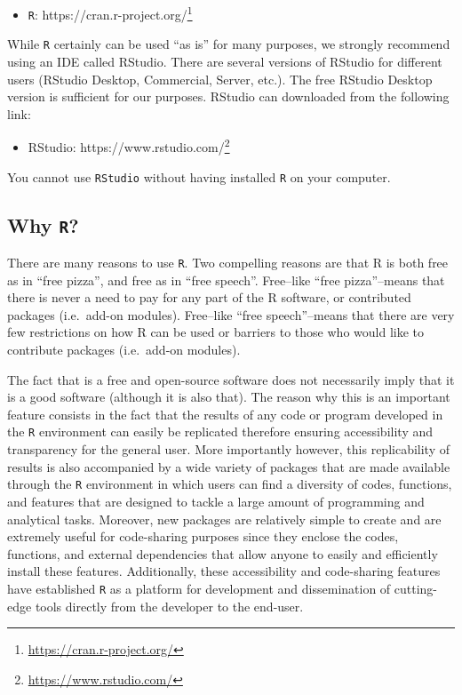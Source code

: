 \documentclass[12pt,]{krantz}
\providecommand{\tightlist}{%
  \setlength{\itemsep}{0pt}\setlength{\parskip}{0pt}}
\renewcommand{\href}[2]{#2\footnote{\url{#1}}}
\let\BeginKnitrBlock\begin \let\EndKnitrBlock\end
\begin{document}
\begin{itemize}
\tightlist
\item
  \href{https://cran.r-project.org/}{\texttt{R}:
  https://cran.r-project.org/}
\end{itemize}

While \texttt{R} certainly can be used ``as is'' for many purposes, we
strongly recommend using an IDE called RStudio. There are several
versions of RStudio for different users (RStudio Desktop, Commercial,
Server, etc.). The free RStudio Desktop version is sufficient for our
purposes. RStudio can downloaded from the following link:

\begin{itemize}
\tightlist
\item
  \href{https://www.rstudio.com/}{RStudio: https://www.rstudio.com/}
\end{itemize}

\BeginKnitrBlock{rmdimportant}
You cannot use \texttt{RStudio} without having installed \texttt{R} on
your computer.
\EndKnitrBlock{rmdimportant}

\subsection{\texorpdfstring{Why \texttt{R}?}{Why R?}}\label{why-r}

There are many reasons to use \texttt{R}. Two compelling reasons are
that R is both free as in ``free pizza'', and free as in ``free
speech''. Free--like ``free pizza''--means that there is never a need to
pay for any part of the R software, or contributed packages (i.e.~add-on
modules). Free--like ``free speech''--means that there are very few
restrictions on how R can be used or barriers to those who would like to
contribute packages (i.e.~add-on modules).

The fact that is a free and open-source software does not necessarily
imply that it is a good software (although it is also that). The reason
why this is an important feature consists in the fact that the results
of any code or program developed in the \texttt{R} environment can
easily be replicated therefore ensuring accessibility and transparency
for the general user. More importantly however, this replicability of
results is also accompanied by a wide variety of packages that are made
available through the \texttt{R} environment in which users can find a
diversity of codes, functions, and features that are designed to tackle
a large amount of programming and analytical tasks. Moreover, new
packages are relatively simple to create and are extremely useful for
code-sharing purposes since they enclose the codes, functions, and
external dependencies that allow anyone to easily and efficiently
install these features. Additionally, these accessibility and
code-sharing features have established \texttt{R} as a platform for
development and dissemination of cutting-edge tools directly from the
developer to the end-user.
\end{document}
